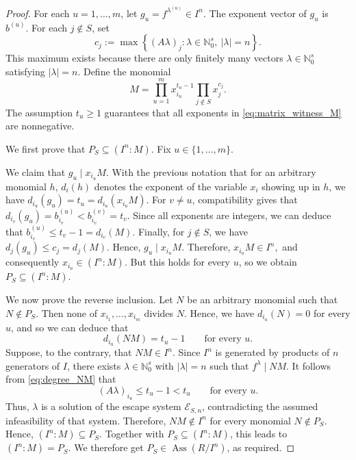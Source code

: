 \documentclass[10pt,a4paper]{amsart}
\begin{document}
\begin{proof}
 For each $u=1,\ldots,m$, let $g_u=f^{\lambda^{(u)}}\in I^n.$ The exponent vector of $g_u$ is $b^{(u)}$.
For each $j\notin S$, set
\[c_j:=\max\left\{(A\lambda)_j:\lambda\in\mathbb N_0^s,\ |\lambda|=n\right\}.\]
This maximum exists because there are only finitely many vectors $\lambda\in\mathbb N_0^s$ satisfying $|\lambda|=n$.
 Define the monomial
\begin{equation}
M
=
\prod_{u=1}^m x_{i_u}^{t_u-1}
\prod_{j\notin S}x_j^{c_j}.
\label{eq:matrix_witness_M}
\end{equation}
The assumption $t_u\geq1$ guarantees that all exponents in \eqref{eq:matrix_witness_M} are nonnegative.

We first prove that $P_S\subseteq(I^n:M).$ Fix $u\in\{1,\ldots,m\}$. 

We claim that $g_u\mid x_{i_u}M.$ With the previous notation that for an arbitrary monomial $h$, $d_i(h)$ denotes the exponent of the variable $x_i$ showing up in $h$, we have $d_{i_u}(g_u)=t_u=d_{i_u}(x_{i_u}M)$.
For $v\neq u$, compatibility gives that $
d_{i_v}(g_u)
=
b^{(u)}_{i_v}
<
b^{(v)}_{i_v}
=
t_v.
$
Since all exponents are integers, we can deduce that $
b^{(u)}_{i_v}
\leq
t_v-1
=
d_{i_v}(M).
$
Finally, for $j\notin S$, we have $
d_j(g_u)
\leq
c_j
=
d_j(M).
$
Hence, $g_u\mid x_{i_u}M.$ Therefore, $x_{i_u}M\in I^n,$
and consequently $x_{i_u}\in(I^n:M).$ But this holds for every $u$, so we obtain
$P_S\subseteq(I^n:M).$

We now prove the reverse inclusion. Let $N$  be an arbitrary monomial such that  $N\notin P_S$.
 Then none of  $x_{i_1},\ldots,x_{i_m}$ divides $N$. Hence, we have $d_{i_u}(N)=0$
 for every $u$, and so we can deduce that
\begin{equation}
d_{i_u}(NM)
=
t_u-1
\qquad
\text{for every }u.
\label{eq:degree_NM}
\end{equation}
Suppose, to the contrary, that $NM\in I^n.$ Since $I^n$ is generated by products of $n$ generators of $I$, there
exists $\lambda\in\mathbb N_0^s$ with $|\lambda|=n$ such that  $f^\lambda\mid NM.$
It follows from \eqref{eq:degree_NM} that
\[
(A\lambda)_{i_u}
\leq
t_u-1
<
t_u
\qquad
\text{for every }u.
\]
Thus,  $\lambda$ is a solution of the escape system $\mathcal E_{S,n}$, contradicting the assumed infeasibility of that
system. Therefore, $NM\notin I^n$ for every monomial $N\notin P_S$. Hence, $(I^n:M)\subseteq P_S.$
Together with $P_S\subseteq(I^n:M)$, this leads to  $(I^n:M)=P_S.$
 We therefore get   $P_S\in\operatorname{Ass}(R/I^n)$, as required.
\end{proof}
\end{document}
